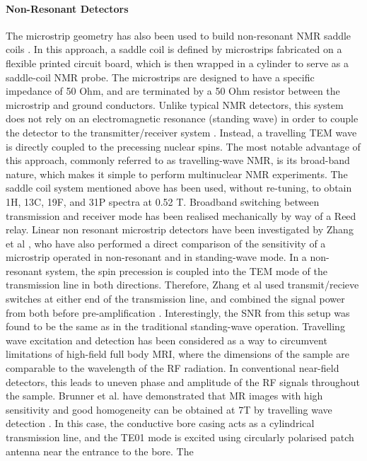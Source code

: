 \paragraph{Non-Resonant Detectors}
The microstrip geometry
has also been used to build non-resonant NMR saddle coils
\cite{Murphree:2007hg}. In this approach, a saddle coil is defined by
microstrips fabricated on a flexible printed circuit board, which is
then wrapped in a cylinder to serve as a saddle-coil NMR probe. The
microstrips are designed to have a specific impedance of 50 Ohm, and are
terminated by a 50 Ohm resistor between the microstrip and ground
conductors. Unlike typical NMR detectors, this system does not rely on
an electromagnetic resonance (standing wave) in order to couple the
detector to the transmitter/receiver system \cite{Mispelter:2006ty}. Instead,
a travelling TEM wave is directly coupled to the precessing nuclear
spins. The most notable advantage of this approach, commonly referred to
as travelling-wave NMR, is its broad-band nature, which makes it simple
to perform multinuclear NMR experiments. The saddle coil system
mentioned above has been used, without re-tuning, to obtain 1H, 13C,
19F, and 31P spectra at 0.52 T. Broadband switching between transmission
and receiver mode has been realised mechanically by way of a Reed relay.
Linear non resonant microstrip detectors have been investigated by Zhang
et al \cite{Zhang:2008uh}, who have also performed a direct comparison of
the sensitivity of a microstrip operated in non-resonant and in
standing-wave mode. In a non-resonant system, the spin precession is
coupled into the TEM mode of the transmission line in both directions.
Therefore, Zhang et al used transmit/recieve switches at either end of
the transmission line, and combined the signal power from both before
pre-amplification \cite{Zhang:2009tu}. Interestingly, the SNR from this
setup was found to be the same as in the traditional standing-wave
operation. Travelling wave excitation and detection has been considered
as a way to circumvent limitations of high-field full body MRI, where
the dimensions of the sample are comparable to the wavelength of the RF
radiation. In conventional near-field detectors, this leads to uneven
phase and amplitude of the RF signals throughout the sample. Brunner et
al. have demonstrated that MR images with high sensitivity and good
homogeneity can be obtained at 7T by travelling wave detection
\cite{Brunner:2009ff}. In this case, the conductive bore casing acts as a
cylindrical transmission line, and the TE01 mode is excited using
circularly polarised patch antenna near the entrance to the bore. The
